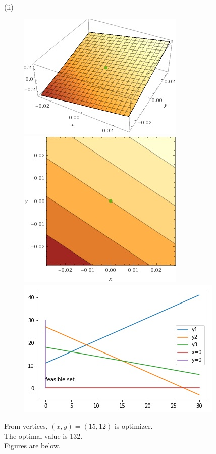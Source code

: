 \documentclass[letterpaper,12pt]{article}
\theoremstyle{definition}
\begin{document}
\begin{enumerate}
\\
\\
\\
(ii) \\
\begin{figure}[htbp]
\begin{center}
    \includegraphics[scale=0.9]{8p2d}
    \includegraphics[scale=0.5]{8p2e}
    \includegraphics[scale=0.5]{8p2f}
    \caption{} \label{fig:label}
\end{center}
\end{figure}
From vertices, $(x, y) = (15, 12)$ is optimizer.\\ The optimal value is 132.\\ Figures are below.\\



\end{enumerate}
\end{document}
